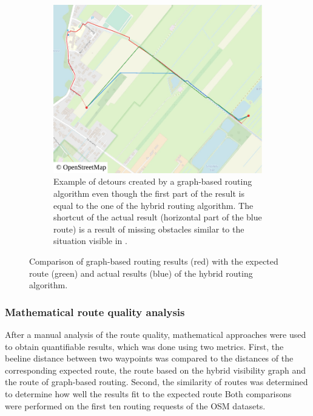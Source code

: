 \begin{figure}[h!]
\begin{minipage}[t]{.48\textwidth}
\begin{subfigure}[t]{\linewidth}
						\includegraphics[width=\textwidth]{images/qgis-routing-rural-routing-17-graph-based}
						\caption{Example of detours created by a graph-based routing algorithm even though the first part of the result is equal to the one of the hybrid routing algorithm. The shortcut of the actual result (horizontal part of the blue route) is a result of missing obstacles similar to the situation visible in .}
						\label{fig:eval-rural-graph-based-comparison-17}
					\end{subfigure}
				\end{minipage}
				\caption{Comparison of graph-based routing results (red) with the expected route (green) and actual results (blue) of the hybrid routing algorithm.}
				\label{fig:eval-rural-graph-based-comparison}
			\end{figure}
		
		\subsubsection{Mathematical route quality analysis}
		
			After a manual analysis of the route quality, mathematical approaches were used to obtain quantifiable results, which was done using two metrics.
			First, the beeline distance between two waypoints was compared to the distances of the corresponding expected route, the route based on the hybrid visibility graph and the route of graph-based routing.
			Second, the similarity of routes was determined to determine how well the results fit to the expected route
			Both comparisons were performed on the first ten routing requests of the OSM datasets.
			
